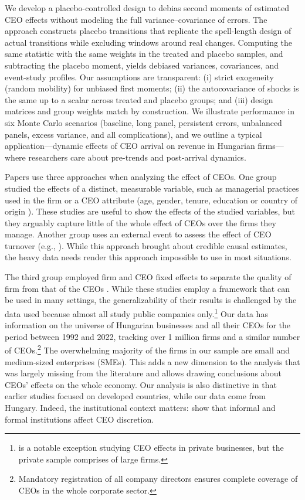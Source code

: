 \documentclass[11pt,a4paper]{article}
\begin{document}
We develop a placebo-controlled design to debias second moments of estimated CEO effects without modeling the full variance–covariance of errors. The approach constructs placebo transitions that replicate the spell-length design of actual transitions while excluding windows around real changes. Computing the same statistic with the same weights in the treated and placebo samples, and subtracting the placebo moment, yields debiased variances, covariances, and event-study profiles. Our assumptions are transparent: (i) strict exogeneity (random mobility) for unbiased first moments; (ii) the autocovariance of shocks is the same up to a scalar across treated and placebo groups; and (iii) design matrices and group weights match by construction. We illustrate performance in six Monte Carlo scenarios (baseline, long panel, persistent errors, unbalanced panels, excess variance, and all complications), and we outline a typical application—dynamic effects of CEO arrival on revenue in Hungarian firms—where researchers care about pre-trends and post-arrival dynamics.

Papers use three approaches when analyzing the effect of CEOs. One group studied the effects of a distinct, measurable variable, such as managerial practices used in the firm \citep{bloom2012organization} or a CEO attribute (age, gender, tenure, education or country of origin \citep{anderson2018pathways, henderson2006quickly, Koren2023expat}). These studies are useful to show the effects of the studied variables, but they arguably capture little of the whole effect of CEOs over the firms they manage. Another group uses an external event to assess the effect of CEO turnover (e.g., \citet{bennedsen2020ceos}). While this approach brought about credible causal estimates, the heavy data needs render this approach impossible to use in most situations. 

The third group employed firm and CEO fixed effects to separate the quality of firm from that of the CEOs \citep{Bertrand2003-io, crossland2011differences, quigley2015has}. While these studies employ a framework that can be used in many settings, the generalizability of their results is challenged by the data used because almost all study public companies only.\footnote{\citet{quigley2022ceo} is a notable exception studying CEO effects in private businesses, but the private sample comprises of large firms.} Our data has information on the universe of Hungarian businesses and all their CEOs for the period between 1992 and 2022, tracking over 1 million firms and a similar number of CEOs.\footnote{Mandatory registration of all company directors ensures complete coverage of CEOs in the whole corporate sector.} The overwhelming majority of the firms in our sample are small and medium-sized enterprises (SMEs). This adds a new dimension to the analysis that was largely missing from the literature and allows drawing conclusions about CEOs' effects on the whole economy. Our analysis is also distinctive in that earlier studies focused on developed countries, while our data come from Hungary. Indeed, the institutional context matters: \citet{crossland2011differences} show that informal and formal institutions affect CEO discretion.
\end{document}
